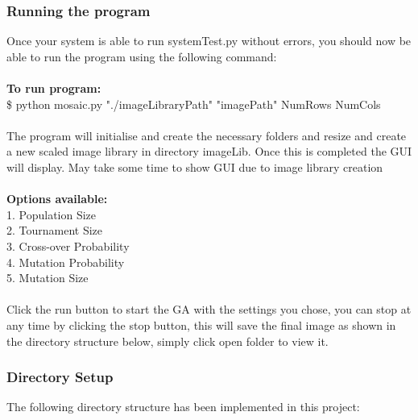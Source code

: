 \documentclass{article}
\begin{document}
\subsubsection*{Running the program}
Once your system is able to run systemTest.py without errors, you should now be able to run the program using the following command:\\
\\
\textbf{To run program:}\\
\$ python mosaic.py "./imageLibraryPath" "imagePath" NumRows NumCols\\\\
The program will initialise and create the necessary folders and resize and create a new scaled image library in directory imageLib. Once this is completed the GUI will display. May take some time to show GUI due to image library creation\\\\
\textbf{Options available:}\\
1. Population Size\\
2. Tournament Size\\
3. Cross-over Probability\\
4. Mutation Probability\\
5. Mutation Size\\\\
Click the run button to start the GA with the settings you chose, you can stop at any time by clicking the stop button, this will save the final image as shown in the directory structure below, simply click open folder to view it.

\subsubsection*{Directory Setup }
The following directory structure has been implemented in this project:
\end{document}

